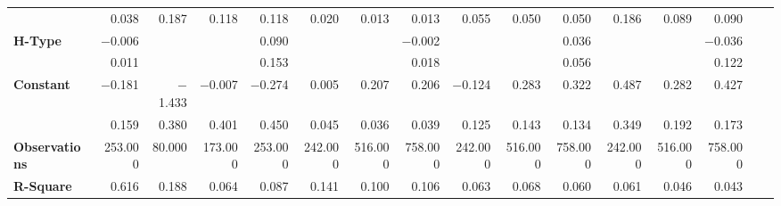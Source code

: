 \begin{tabular}{@{\extracolsep{5pt}}lrrrrrrrrrrrrrrr}
{\bf } & 0.038\phantom{\phantom{)}***} & 0.187\phantom{\phantom{)}***} & 0.118\phantom{\phantom{)}***} & 0.118\phantom{\phantom{)}***} & 0.020\phantom{\phantom{)}***} & 0.013\phantom{\phantom{)}***} & 0.013\phantom{\phantom{)}***} & 0.055\phantom{\phantom{)}***} & 0.050\phantom{\phantom{)}***} & 0.050\phantom{\phantom{)}***} & 0.186\phantom{\phantom{)}***} & 0.089\phantom{\phantom{)}***} & 0.090\phantom{\phantom{)}***} \\
{\bf H-Type} & $-$0.006\phantom{\phantom{)}***} & \phantom{***} & \phantom{***} & 0.090\phantom{\phantom{)}***} & \phantom{***} & \phantom{***} & $-$0.002\phantom{\phantom{)}***} & \phantom{***} & \phantom{***} & 0.036\phantom{\phantom{)}***} & \phantom{***} & \phantom{***} & $-$0.036\phantom{\phantom{)}***} \\
{\bf } & 0.011\phantom{\phantom{)}***} & \phantom{***} & \phantom{***} & 0.153\phantom{\phantom{)}***} & \phantom{***} & \phantom{***} & 0.018\phantom{\phantom{)}***} & \phantom{***} & \phantom{***} & 0.056\phantom{\phantom{)}***} & \phantom{***} & \phantom{***} & 0.122\phantom{\phantom{)}***} \\
{\bf Constant} & $-$0.181\phantom{\phantom{)}***} & $-$1.433\phantom{\phantom{)}***} & $-$0.007\phantom{\phantom{)}***} & $-$0.274\phantom{\phantom{)}***} & 0.005\phantom{\phantom{)}***} & 0.207\phantom{\phantom{)}***} & 0.206\phantom{\phantom{)}***} & $-$0.124\phantom{\phantom{)}***} & 0.283\phantom{\phantom{)}***} & 0.322\phantom{\phantom{)}***} & 0.487\phantom{\phantom{)}***} & 0.282\phantom{\phantom{)}***} & 0.427\phantom{\phantom{)}***} \\
{\bf } & 0.159\phantom{\phantom{)}***} & 0.380\phantom{\phantom{)}***} & 0.401\phantom{\phantom{)}***} & 0.450\phantom{\phantom{)}***} & 0.045\phantom{\phantom{)}***} & 0.036\phantom{\phantom{)}***} & 0.039\phantom{\phantom{)}***} & 0.125\phantom{\phantom{)}***} & 0.143\phantom{\phantom{)}***} & 0.134\phantom{\phantom{)}***} & 0.349\phantom{\phantom{)}***} & 0.192\phantom{\phantom{)}***} & 0.173\phantom{\phantom{)}***} \\
{\bf Observations} & 253.000\phantom{\phantom{)}***} & 80.000\phantom{\phantom{)}***} & 173.000\phantom{\phantom{)}***} & 253.000\phantom{\phantom{)}***} & 242.000\phantom{\phantom{)}***} & 516.000\phantom{\phantom{)}***} & 758.000\phantom{\phantom{)}***} & 242.000\phantom{\phantom{)}***} & 516.000\phantom{\phantom{)}***} & 758.000\phantom{\phantom{)}***} & 242.000\phantom{\phantom{)}***} & 516.000\phantom{\phantom{)}***} & 758.000\phantom{\phantom{)}***} \\
{\bf R-Square} & 0.616\phantom{***} & 0.188\phantom{***} & 0.064\phantom{***} & 0.087\phantom{***} & 0.141\phantom{***} & 0.100\phantom{***} & 0.106\phantom{***} & 0.063\phantom{***} & 0.068\phantom{***} & 0.060\phantom{***} & 0.061\phantom{***} & 0.046\phantom{***} & 0.043\phantom{***} \\
\hline
\end{tabular}
